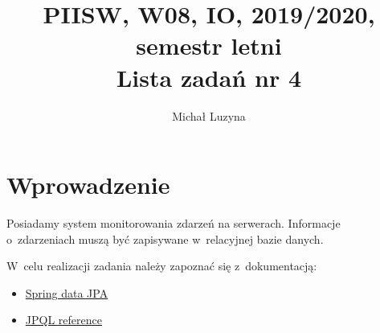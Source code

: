 \documentclass[12pt]{article}
\title{PIISW, W08, IO, 2019/2020, semestr letni\\Lista zadań nr 4}
\author{Michał Luzyna}
\begin{document}
    \maketitle

    \section*{Wprowadzenie}
        Posiadamy system monitorowania zdarzeń na serwerach. Informacje o~zdarzeniach muszą być zapisywane w~relacyjnej bazie danych.

        W~celu realizacji zadania należy zapoznać się z~dokumentacją:
        \begin{itemize}
            \item \href{https://docs.spring.io/spring-data/jpa/docs/current/reference/html/}{Spring data JPA}
            \item \href{https://docs.oracle.com/javaee/6/tutorial/doc/bnbuf.html}{JPQL reference}
        \end{itemize}
\end{document}
